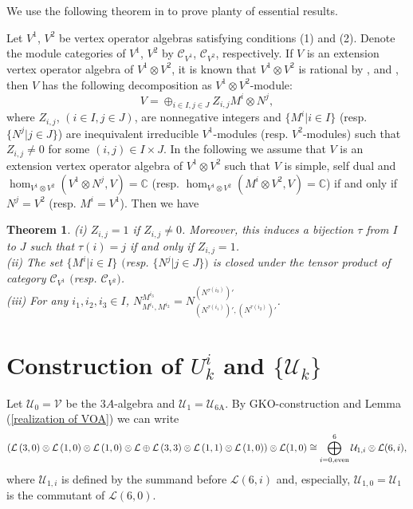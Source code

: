 \documentclass{article}
\newtheorem{theorem}[lemma]{Theorem}
\newcommand{\cc}{{\mathcal C}}
\newcommand{\Hom}{{\rm Hom}\,}
\begin{document}
We use the following theorem in \cite{Lin} to prove planty of essential results.

Let $V^1$, $V^2$ be  vertex operator algebras satisfying conditions (1) and (2). Denote  the module categories of $V^1$, $V^2$ by  $\mathcal{C}_{V^1}$, $\mathcal{C}_{V^2}$, respectively. 
If $V$ is an extension vertex operator algebra of $V^1\otimes V^2$, it is known that $V^1\otimes V^2$ is rational by \cite{FHL}, 
\cite{DMZ} and \cite{ABD},  then  $V$ has the following decomposition as $V^1\otimes V^2$-module:
$$V=\oplus_{i\in I, j\in J}Z_{i,j}M^i\otimes N^j,$$
where $Z_{i, j}$, $(i\in I, j\in J)$,  are nonnegative integers  and $\{M^i|i\in I\}$ (resp. $\{N^j|j\in J\}$) are inequivalent 
irreducible $V^1$-modules (resp. $V^2$-modules) such that $Z_{i, j}\neq 0$  for some $(i,j)\in I\times J$. 
In the following we  assume that $V$ is an  extension vertex operator algebra  of $V^1\otimes V^2$ such that $V$ is simple, self dual
and $\hom_{V^1\otimes V^2}(V^1\otimes N^j, V)=\mathbb{C}$ (resp. $\hom_{V^1\otimes V^2}(M^i\otimes V^2, V)=\mathbb{C}$) if and only if $N^j=V^2$ (resp. $M^i=V^1$).
Then we have

\begin{theorem}\label{c1}
(i) $Z_{i,j}=1$ if $Z_{i,j}\neq 0$. Moreover, this induces a bijection $\tau$ from $I$ to $J$ such that $\tau(i)=j$ if and only if $Z_{i, j}=1$. \\
(ii) The set $\{M^i| i\in I\}$ $($resp. $\{N^j| j\in J\})$ is closed under the tensor product of category $\mathcal{C}_{V^1}$ $($resp. $\mathcal{C}_{V^2})$. \\
(iii) For any $i_1, i_2,i_3\in I$,  $N_{M^{i_1}, M^{i_2}}^{M^{i_3}}=N_{(N^{\tau(i_1)})', (N^{\tau(i_2)})'}^{(N^{\tau(i_3)})'}$.
\end{theorem}

\section{Construction of $U_k^i$ and $\{\mathcal{U}_k\}$}
Let $\mathcal{U}_{0}=\mathcal{V}$ be the $3A$-algebra and $\mathcal{U}_1=\mathcal{U}_{\operatorname{6A}}$.
By GKO-construction and Lemma (\ref{realization of VOA}) we can write
$$\left(\mathcal{L}\left(3,0\right)\otimes\mathcal{L}\left(1,0\right)\otimes\mathcal{L}\left(1,0\right)\otimes\mathcal{L}\oplus\mathcal{L}\left(3,3\right)\otimes\mathcal{L}\left(1,1\right)\otimes\mathcal{L}\left(1,0\right)\right)\otimes\mathcal{L}(1,0)\cong\bigoplus_{i=0,\rm{even}}^6\mathcal{U}_{1,i}\otimes \mathcal{L}(6,i),$$
where $\mathcal{U}_{1,i}$ is defined by the summand before $\mathcal{L}(6,i)$ 
and, especially, $\mathcal{U}_{1,0}=\mathcal{U}_{1}$ is the commutant of $\mathcal{L}(6,0)$.
\end{document}
